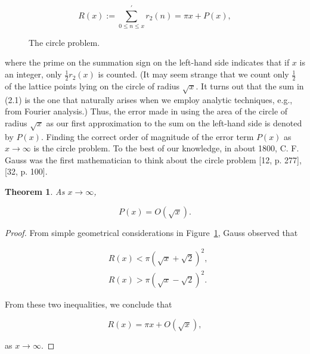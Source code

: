 \documentclass[10pt]{article}
\theoremstyle{plain}
\newtheorem{theorem}{Theorem}
\begin{document}
\begin{equation*}
R(x):=\sum_{0 \leq n \leq x}^{\prime} r_{2}(n)=\pi x+P(x), \tag{2.1}
\end{equation*}


\begin{figure}[H]
\centering
{}
\caption{The circle problem.}
\label{fig:circle-problem}
\end{figure}

where the prime on the summation sign on the left-hand side indicates that if $x$ is an integer, only $\frac{1}{2} r_{2}(x)$ is counted. (It may seem strange that we count only $\frac{1}{2}$ of the lattice points lying on the circle of radius $\sqrt{x}$. It turns out that the sum in (2.1) is the one that naturally arises when we employ analytic techniques, e.g., from Fourier analysis.) Thus, the error made in using the area of the circle of radius $\sqrt{x}$ as our first approximation to the sum on the left-hand side is denoted by $P(x)$. Finding the correct order of magnitude of the error term $P(x)$ as $x \to \infty$ is the circle problem. To the best of our knowledge, in about 1800, C. F. Gauss was the first mathematician to think about the circle problem [12, p. 277], [32, p. 100].

\begin{theorem}
As $x \to \infty$,

\[
P(x)=O(\sqrt{x}).
\]
\end{theorem}

\begin{proof}
From simple geometrical considerations in Figure~\ref{fig:circle-problem}, Gauss observed that

$$
\begin{aligned}
& R(x)<\pi(\sqrt{x}+\sqrt{2})^{2}, \\
& R(x)>\pi(\sqrt{x}-\sqrt{2})^{2} .
\end{aligned}
$$

From these two inequalities, we conclude that

$$
R(x)=\pi x+O(\sqrt{x}),
$$

as $x \to \infty$.
\end{proof}
\end{document}
